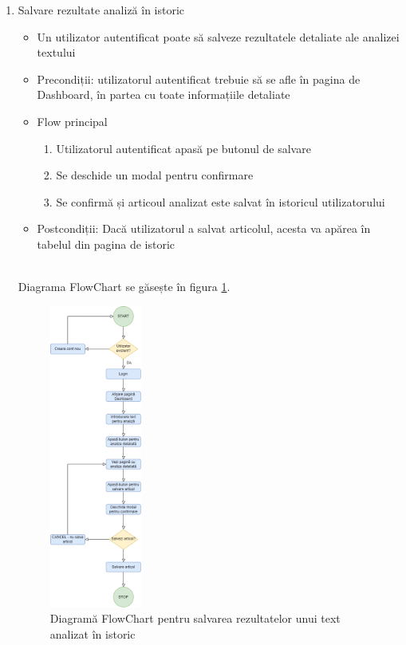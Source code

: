 \begin{enumerate}
    \item Salvare rezultate analiză în istoric
    \begin{itemize}
        \setlength\itemsep{0.5em}
        \item Un utilizator autentificat poate să salveze rezultatele detaliate ale analizei textului
        \item Precondiții: utilizatorul autentificat trebuie să se afle în pagina de Dashboard, în partea cu toate informațiile detaliate
        \item Flow principal
        \begin{enumerate}
            \setlength\itemsep{0.5em}
            \item Utilizatorul autentificat apasă pe butonul de salvare
            \item Se deschide un modal pentru confirmare
            \item Se confirmă și articoul analizat este salvat în istoricul utilizatorului
        \end{enumerate}
        \item Postcondiții: Dacă utilizatorul a salvat articolul, acesta va apărea în tabelul din pagina de istoric
    \end{itemize}
\ \\
    Diagrama FlowChart se găsește în figura \ref{fig:saveArticleFlowchart}.
    \begin{figure}[H]
        \centering
        \includegraphics[height=100mm]{figs/saveArticleFlowchart.png}
        \caption{Diagramă FlowChart pentru salvarea rezultatelor unui text analizat în istoric}
        \label{fig:saveArticleFlowchart}
    \end{figure}


\end{enumerate}

